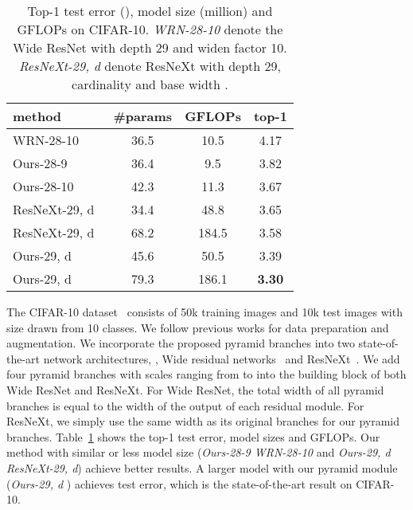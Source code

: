 \documentclass[10pt,twocolumn,letterpaper]{article}
\begin{document}
\begin{table}[]
\begin{small}
\centering
\caption{Top-1 test error (), model size (million) and GFLOPs on CIFAR-10. \textit{WRN-28-10} denote the Wide ResNet with depth 29 and widen factor 10. \textit{ResNeXt-29, d} denote ResNeXt with depth 29, cardinality  and base width . 
}
\label{table:cifar-comparison}
\begin{tabular} {lccc}\hline
method      		& \#params	& GFLOPs 	& top-1 \\
\hline
WRN-28-10~\cite{zagoruyko2016WRN}         	
					& 36.5 		& 10.5		& 4.17         \\   
Ours-28-9        	& 36.4		& 9.5		& 3.82	   	   \\ 
Ours-28-10    		& 42.3 		& 11.3 		& 3.67         \\
\hline  
ResNeXt-29, d~\cite{xie2016aggregated}
					& 34.4  	& 48.8 		& 3.65        \\   
ResNeXt-29, d~\cite{xie2016aggregated}  
					& 68.2  	& 184.5 	& 3.58        \\   
Ours-29, d 		
					& 45.6  	& 50.5		& 3.39        \\ 
Ours-29, d		
					& 79.3	  	& 186.1		& \textbf{3.30}    	        \\ 
\hline 
\end{tabular}
\end{small}
\vspace{-0.2em}
\end{table}

The CIFAR-10 dataset~\cite{krizhevsky2009learning} consists of 50k training images and 10k test images with size  drawn from 10 classes. 
We follow previous works for data preparation and augmentation. 
We incorporate the proposed pyramid branches into two state-of-the-art network architectures, \ie, Wide residual networks~\cite{zagoruyko2016WRN} and ResNeXt~\cite{xie2016aggregated}. 
We add four pyramid branches with scales ranging from  to  into the building block of both Wide ResNet and ResNeXt. 
For Wide ResNet, the total width of all pyramid branches is equal to the width of the output of each residual module.   
For ResNeXt, we simply use the same width as its original branches for our pyramid branches. 
Table~\ref{table:cifar-comparison} shows the top-1 test error, model sizes and GFLOPs. 
Our method with similar or less model size (\textit{Ours-28-9 \vs WRN-28-10} and \textit{Ours-29, d \vs ResNeXt-29, d}) achieve better results. A larger model with our pyramid module (\textit{Ours-29, d	}) achieves  test error, which is the state-of-the-art result on CIFAR-10. 
\end{document}
